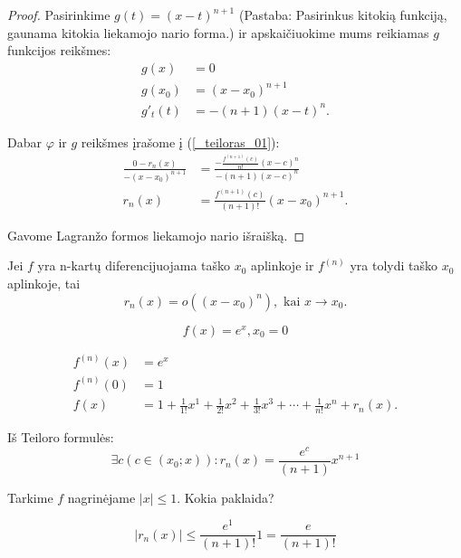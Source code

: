 \begin{prop}
\begin{proof}
    Pasirinkime $g(t) = (x - t)^{n + 1}$ (Pastaba: Pasirinkus kitokią 
    funkciją, gaunama kitokia liekamojo nario forma.) ir apskaičiuokime
    mums reikiamas $g$ funkcijos reikšmes:
    \begin{align*}
      g(x) &= 0 \\
      g(x_{0}) &= (x - x_{0})^{n + 1} \\
      g'_{t}(t) &= - (n + 1)(x - t)^{n}.
    \end{align*}

    Dabar $\varphi$ ir $g$ reikšmes įrašome į (\ref{_teiloras_01}):
    \begin{align*}
      \frac{0 - r_{n}(x)}{-(x - x_{0})^{n + 1}} 
      &= \frac{- \frac{f^{(n + 1)}(c)}{n!}(x - c)^{n}}
        {-(n + 1)(x - c)^{n}} \\
        r_{n}(x) &= \frac{f^{(n + 1)}(c)}{(n + 1)!}(x - x_{0})^{n + 1}.
    \end{align*}

    Gavome Lagranžo formos liekamojo nario išraišką.

  \end{proof}

\end{prop}

\begin{prop}
  Jei $f$ yra n-kartų diferencijuojama taško $x_{0}$ aplinkoje ir
  $f^{(n)}$ yra tolydi taško $x_{0}$ aplinkoje, tai
  \begin{equation*}
    r_{n} (x) = o((x - x_{0})^{n}), \text{ kai } x \to x_{0}.
  \end{equation*}
\end{prop}

\begin{exmp}
  \begin{equation*}
    f(x) = e^{x}, x_{0} = 0
  \end{equation*}

  \begin{align*}
    f^{(n)}(x) &= e^{x} \\
    f^{(n)}(0) &= 1 \\
    f(x) &= 1 + \frac{1}{1!}x^{1} + \frac{1}{2!}x^{2} + 
      \frac{1}{3!}x^{3} + \cdots + \frac{1}{n!}x^{n} + r_{n}(x).
  \end{align*}

  Iš Teiloro formulės:
  \begin{equation*}
    \exists c (c \in (x_{0}; x)) : r_{n}(x) = 
      \frac{e^{c}}{(n + 1)}x^{n + 1}
  \end{equation*}

  Tarkime $f$ nagrinėjame $|x| \leq 1$. Kokia paklaida?

  \begin{equation*}
    |r_{n}(x)| \leq \frac{e^{1}}{(n + 1)!}1 = \frac{e}{(n + 1)!}
  \end{equation*}
\end{exmp}
